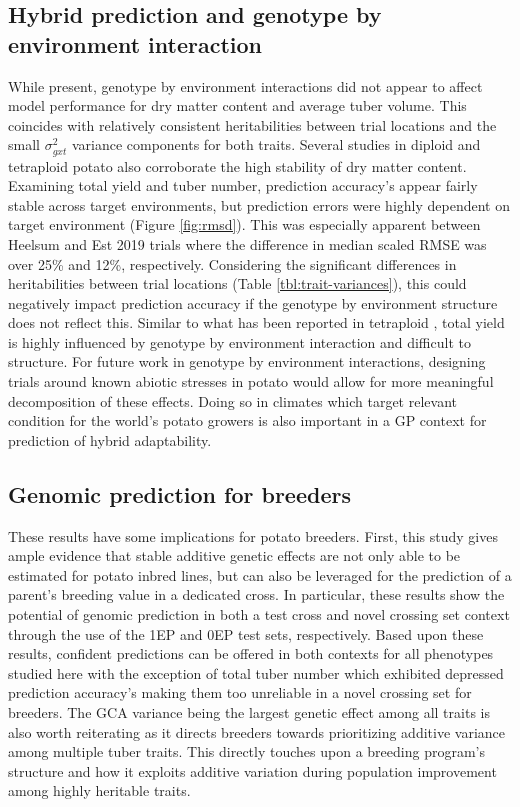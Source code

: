 \subsection{Hybrid prediction and genotype by environment interaction}

While present, genotype by environment interactions did not appear to affect model performance for dry matter content and average tuber volume. This coincides with relatively consistent heritabilities between trial locations and the small \(\sigma_{gxt}^2\) variance components for both traits. Several studies in diploid \cite{Stockem2020} and tetraploid \cite{Endelman2018, Cuevas2022, Ortiz2022, Wilson2023} potato also corroborate the high stability of dry matter content. Examining total yield and tuber number, prediction accuracy's appear fairly stable across target environments, but prediction errors were highly dependent on target environment (Figure \ref{fig:rmsd}). This was especially apparent between Heelsum and Est 2019 trials where the difference in median scaled RMSE was over 25\% and 12\%, respectively. Considering the significant differences in heritabilities between trial locations (Table \ref{tbl:trait-variances}), this could negatively impact prediction accuracy if the genotype by environment structure does not reflect this. Similar to what has been reported in tetraploid \cite{Cuevas2022, Ortiz2022, Wilson2023}, total yield is highly influenced by genotype by environment interaction and difficult to structure. For future work in genotype by environment interactions, designing trials around known abiotic stresses in potato would allow for more meaningful decomposition of these effects. Doing so in climates which target relevant condition for the world's potato growers is also important in a GP context for prediction of hybrid adaptability.

\subsection{Genomic prediction for breeders}

These results have some implications for potato breeders. First, this study gives ample evidence that stable additive genetic effects are not only able to be estimated for potato inbred lines, but can also be leveraged for the prediction of a parent's breeding value in a dedicated cross. In particular, these results show the potential of genomic prediction in both a test cross and novel crossing set context through the use of the 1EP and 0EP test sets, respectively. Based upon these results, confident predictions can be offered in both contexts for all phenotypes studied here with the exception of total tuber number which exhibited depressed prediction accuracy's making them too unreliable in a novel crossing set for breeders. The GCA variance being the largest genetic effect among all traits is also worth reiterating as it directs breeders towards prioritizing additive variance among multiple tuber traits. This directly touches upon a breeding program's structure and how it exploits additive variation during population improvement among highly heritable traits. 

